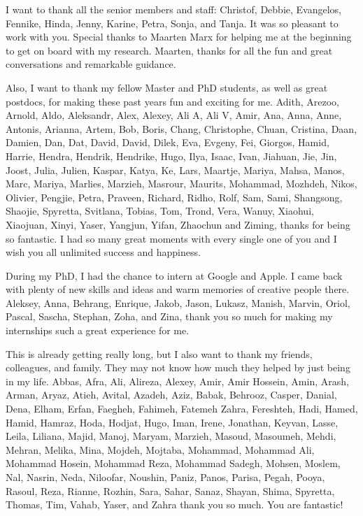 I want to thank all the senior members and staff: Christof, Debbie, Evangelos, Fennike, Hinda, Jenny, Karine, Petra, Sonja, and Tanja. It was so pleasant to work with you.
Special thanks to Maarten Marx for helping me at the beginning to get on board with my research. Maarten, thanks for all the fun and great conversations and remarkable guidance.

Also, I want to thank my fellow Master and PhD students, as well as great postdocs, for making these past years fun and exciting for me. Adith, Arezoo, Arnold, Aldo, Aleksandr, Alex, Alexey, Ali A, Ali V, Amir, Ana, Anna, Anne, Antonis, Arianna, Artem, Bob, Boris, Chang, Christophe, Chuan, Cristina, Daan, Damien, Dan, Dat, David, David, Dilek, Eva, Evgeny, Fei, Giorgos, Hamid, Harrie, Hendra, Hendrik, Hendrike, Hugo, Ilya, Isaac, Ivan, Jiahuan, Jie, Jin, Joost, Julia, Julien, Kaspar, Katya, Ke, Lars, Maartje, Mariya, Mahsa, Manos, Marc, Mariya, Marlies, Marzieh, Masrour, Maurits, Mohammad, Mozhdeh, Nikos, Olivier, Pengjie, Petra, Praveen, Richard, Ridho, Rolf, Sam, Sami, Shangsong, Shaojie, Spyretta, Svitlana, Tobias, Tom, Trond, Vera, Wanuy, Xiaohui, Xiaojuan, Xinyi, Yaser, Yangjun, Yifan, Zhaochun and Ziming, thanks for being so fantastic.  I had so many great moments with every single one of you and I wish you all unlimited success and happiness.


During my PhD, I had the chance to intern at Google and Apple. I came back with plenty of new skills and ideas and warm memories of creative people there. Aleksey, Anna, Behrang, Enrique, Jakob, Jason, Lukasz, Manish, Marvin, Oriol, Pascal, Sascha, Stephan, Zoha, and Zina, thank you so much for making my internships such a great experience for me. 

This is already getting really long, but I also want to thank my friends, colleagues, and family. They may not know how much they helped by just being in my life. Abbas, Afra, Ali, Alireza, Alexey, Amir, Amir Hossein, Amin, Arash, Arman, Aryaz, Atieh, Avital, Azadeh, Aziz, Babak, Behrooz, Casper, Danial, Dena, Elham, Erfan, Faegheh, Fahimeh, Fatemeh Zahra, Fereshteh, Hadi, Hamed, Hamid, Hamraz, Hoda, Hodjat, Hugo, Iman, Irene, Jonathan, Keyvan, Lasse, Leila, Liliana, Majid, Manoj, Maryam, Marzieh, Masoud, Masoumeh, Mehdi, Mehran, Melika, Mina, Mojdeh, Mojtaba, Mohammad, Mohammad Ali, Mohammad Hosein, Mohammad Reza, Mohammad Sadegh, Mohsen, Moslem, Nal, Nasrin, Neda, Niloofar, Noushin, Paniz, Panos, Parisa, Pegah, Pooya, Rasoul, Reza, Rianne, Rozhin, Sara, Sahar, Sanaz, Shayan, Shima, Spyretta, Thomas, Tim, Vahab, Yaser, and Zahra thank you so much. You are fantastic!

